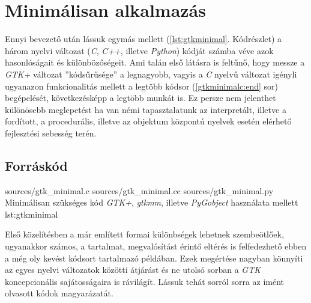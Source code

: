 \section{Minimálisan alkalmazás}
\label{sec:gtkminimal}
\label{sec:gtkmmminimal}

Ennyi bevezető után lássuk egymás mellett (\ref{lst:gtkminimal}. Kódrészlet) a három nyelvi változat (\textit{C}, \textit{C++}, illetve \textit{Python}) kódját számba véve azok hasonlóságait és különbözőségeit. Ami talán első látásra is feltűnő, hogy messze a \textit{GTK+} változat ''kódsűrűsége'' a legnagyobb, vagyis a \textit{C} nyelvű változat igényli ugyanazon funkcionalitás mellett a legtöbb kódsor (\ref{gtkminimalc:end} sor) begépelését, következésképp a legtöbb munkát is. Ez persze nem jelenthet különösebb meglepetést ha van némi tapasztalatunk az interpretált, illetve a fordított, a procedurális, illetve az objektum központú nyelvek esetén elérhető fejlesztési sebesség terén.

\subsection{Forráskód}

\lsttriplesource
{sources/gtk_minimal.c}
{sources/gtk_minimal.cc}
{sources/gtk_minimal.py}
{Minimálisan szükséges kód \textit{GTK+}, \textit{gtkmm}, illetve \textit{PyGobject} használata mellett}
{lst:gtkminimal}

Első közelítésben a már említett formai különbségek lehetnek szembeötlőek, ugyanakkor számos, a tartalmat, megvalósítást érintő eltérés is felfedezhető ebben a még oly kevést kódsort tartalmazó példában. Ezek megértése nagyban könnyíti az egyes nyelvi változatok közötti átjárást és ne utolsó sorban a \textit{GTK} koncepcionális sajátosságaira is rávilágít. Lássuk tehát sorról sorra az imént olvasott kódok magyarázatát.

